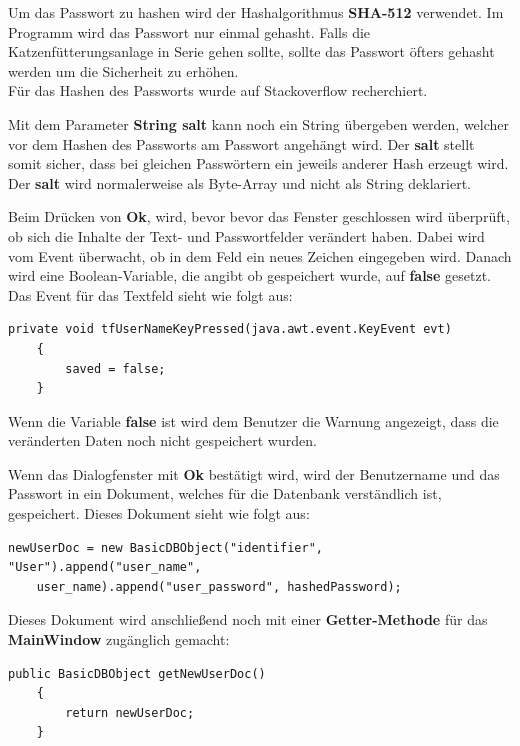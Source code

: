 Um das Passwort zu hashen wird der Hashalgorithmus \textbf{SHA-512} verwendet. Im Programm wird das Passwort nur einmal gehasht. Falls die Katzenfütterungsanlage in Serie gehen sollte, sollte das Passwort öfters gehasht werden um die Sicherheit zu erhöhen.
\\ Für das Hashen des Passworts wurde auf Stackoverflow  recherchiert.

Mit dem Parameter \textbf{String salt} kann noch ein String übergeben werden, welcher vor dem Hashen des Passworts am Passwort angehängt wird. Der \textbf{salt} stellt somit sicher, dass bei gleichen Passwörtern ein jeweils anderer Hash erzeugt wird. Der  \textbf{salt} wird normalerweise als Byte-Array und nicht als String deklariert.

\vspace{10pt}

Beim Drücken von \textbf{Ok}, wird, bevor bevor das Fenster geschlossen wird überprüft, ob sich die Inhalte der Text- und Passwortfelder verändert haben. Dabei wird vom Event überwacht, ob in dem Feld ein neues Zeichen eingegeben wird. Danach wird eine Boolean-Variable, die angibt ob gespeichert wurde, auf \textbf{false} gesetzt. Das Event für das Textfeld sieht wie folgt aus:
\begin{lstlisting}[style=Javastyle, caption=Textfeld Event]
	private void tfUserNameKeyPressed(java.awt.event.KeyEvent evt)                                       
	{                                           
		saved = false;
	}
\end{lstlisting}
Wenn die Variable \textbf{false} ist wird dem Benutzer die Warnung angezeigt, dass die veränderten Daten noch nicht gespeichert wurden.

\vspace{10pt}

Wenn das Dialogfenster mit \textbf{Ok} bestätigt wird, wird der Benutzername und das Passwort in ein Dokument, welches für die Datenbank verständlich ist, gespeichert. Dieses Dokument sieht wie folgt aus:
\begin{lstlisting}[style=Javastyle, caption=Benutzerdokument]
newUserDoc = new BasicDBObject("identifier", "User").append("user_name", 
	user_name).append("user_password", hashedPassword);
\end{lstlisting}

Dieses Dokument wird anschließend noch mit einer \textbf{Getter-Methode} für das  \textbf{MainWindow} zugänglich gemacht:
\begin{lstlisting}[style=Javastyle, caption=Benutzerdokument Getter-Methode]
	public BasicDBObject getNewUserDoc()
	{
		return newUserDoc;
	}
\end{lstlisting}


